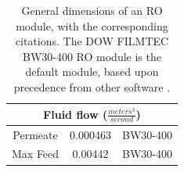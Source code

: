 \documentclass[fleqn,10pt]{wlscirep}
\begin{document}
\begin{savenotes}
\begin{table}[!h]
\begin{tabular}{|c|c|c|}
        \multicolumn{3}{c}{Fluid flow ($\frac{meters^3}{second}$)} \\ \midrule
        Permeate & 0.000463 & BW30-400 \cite{2020FilmTecElement}\\
        Max Feed & 0.00442 & BW30-400 \cite{2020FilmTecElement}\\ \bottomrule
        
    \end{tabular}
    
    \caption{
        General dimensions of an RO module, with the corresponding citations. The DOW FILMTEC BW30-400 RO module is the default module, based upon precedence from other software \cite{Li2012OptimalDesalination}.
    }
    \label{RO_dimensions}
\end{table}
\end{savenotes}
\end{document}
